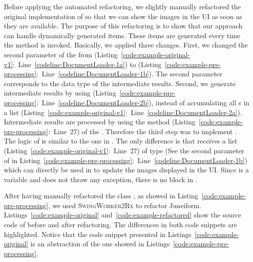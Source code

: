 \documentclass[type=bsc,accentcolor=tud9c]{tudthesis}
\newcommand{\toolextension}{\textsc{SwingWorker2Rx}}
\begin{document}
Before applying the automated refactoring, we slightly manually refactored the original implementation of  so that we can show the images in the UI as soon as they are available. The purpose of this refactoring is to show that our approach can handle dynamically generated items. These items are generated every time the method  is invoked. Basically, we applied three changes. First, we changed the second parameter of the  from  (Listing~\ref{code:example-original-v1}:~Line~\ref{codeline:DocumentLoader-1a}) to  (Listing~\ref{code:example-pre-processing}:~Line~\ref{codeline:DocumentLoader-1b}). The second parameter corresponds to the data type of the intermediate results. Second, we generate intermediate results by using  (Listing~\ref{code:example-pre-processing}:~Line~\ref{codeline:DocumentLoader-2b}), instead of accumulating all s in a list (Listing~\ref{code:example-original-v1}:~Line~\ref{codeline:DocumentLoader-2a}). Intermediate results are processed by using the method  (Listing~\ref{code:example-pre-processing}:~Line~27) of the . Therefore the third step was to implement . The logic of  is similar to the one in . The only difference is that  receives a list  (Listing~\ref{code:example-original-v1}:~Line~27) of type  (See the second parameter of  in Listing~\ref{code:example-pre-processing}:~Line~\ref{codeline:DocumentLoader-1b}) which can directly be used in  to update the images displayed in the UI. Since  is a variable and  does not throw any exception, there is no  block in .





After having manually refactored the class , as showed in Listing~\ref{code:example-pre-processing}, we used \toolextension{} to refactor Juneiform. Listings~\ref{code:example-original} and~\ref{code:example-refactored} show the source code of  before and after refactoring. The differences in both code snippets are highlighted. Notice that the code snippet presented in Listings~\ref{code:example-original} is an abstraction of the one showed in Listings~\ref{code:example-pre-processing}.
\end{document}
